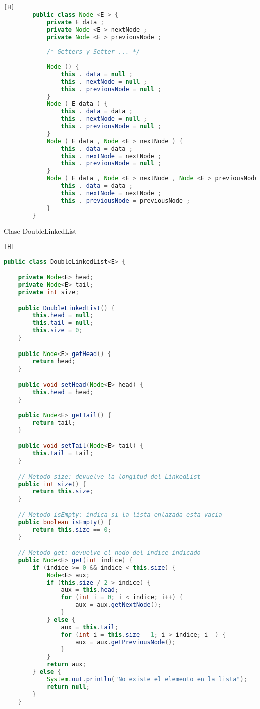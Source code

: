 \begin{enumerate}[{Ejercicio} 1.]
	
	\begin{lstlisting}[language=java, caption={caption}][H]
		public class Node <E > {
			private E data ;
			private Node <E > nextNode ;
			private Node <E > previousNode ;
			
			/* Getters y Setter ... */
			
			Node () {
				this . data = null ;
				this . nextNode = null ;
				this . previousNode = null ;
			}
			Node ( E data ) {
				this . data = data ;
				this . nextNode = null ;
				this . previousNode = null ;
			}
			Node ( E data , Node <E > nextNode ) {
				this . data = data ;
				this . nextNode = nextNode ;
				this . previousNode = null ;
			}
			Node ( E data , Node <E > nextNode , Node <E > previousNode ) {
				this . data = data ;
				this . nextNode = nextNode ;
				this . previousNode = previousNode ;
			}
		}
	\end{lstlisting}
	Clase DoubleLinkedList
	\begin{lstlisting}[language=java, caption={DoubleLinkedList}][H]
		
public class DoubleLinkedList<E> {

    private Node<E> head;
    private Node<E> tail;
    private int size;

    public DoubleLinkedList() {
        this.head = null;
        this.tail = null;
        this.size = 0;
    }

    public Node<E> getHead() {
        return head;
    }

    public void setHead(Node<E> head) {
        this.head = head;
    }

    public Node<E> getTail() {
        return tail;
    }

    public void setTail(Node<E> tail) {
        this.tail = tail;
    }

    // Metodo size: devuelve la longitud del LinkedList
    public int size() {
        return this.size;
    }

    // Metodo isEmpty: indica si la lista enlazada esta vacia
    public boolean isEmpty() {
        return this.size == 0;
    }

    // Metodo get: devuelve el nodo del indice indicado
    public Node<E> get(int indice) {
        if (indice >= 0 && indice < this.size) {
            Node<E> aux;
            if (this.size / 2 > indice) {
                aux = this.head;
                for (int i = 0; i < indice; i++) {
                    aux = aux.getNextNode();
                }
            } else {
                aux = this.tail;
                for (int i = this.size - 1; i > indice; i--) {
                    aux = aux.getPreviousNode();
                }
            }
            return aux;
        } else {
            System.out.println("No existe el elemento en la lista");
            return null;
        }
    }


\end{lstlisting}
\end{enumerate}
